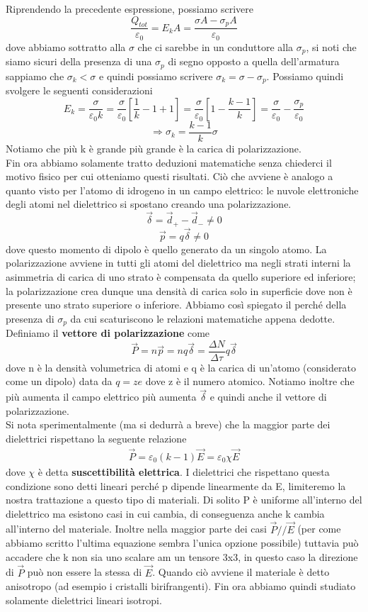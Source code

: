 \documentclass[10pt,a4paper]{article}
\begin{document}
Riprendendo la precedente espressione, possiamo scrivere
 \[\frac{Q_{tot}}{\varepsilon_0} = E_k A = \frac{\sigma A - \sigma_p A}{\varepsilon_0}\]
dove abbiamo sottratto alla $\sigma$ che ci sarebbe in un conduttore alla $\sigma_p$, si noti che siamo sicuri della presenza di una $\sigma_p$ di segno opposto a quella dell'armatura  sappiamo che \(\sigma_k<\sigma\) e quindi possiamo scrivere \(\sigma_k = \sigma -\sigma_p\). Possiamo quindi svolgere le seguenti considerazioni
\[E_k = \frac{\sigma }{\varepsilon_0 k} = \frac{\sigma}{\varepsilon_0}\left[\frac{1}{k}-1+1\right] = \frac{\sigma}{\varepsilon_0}\left[1-\frac{k-1}{k}\right] = \frac{\sigma}{\varepsilon_0}-\frac{\sigma_p}{\varepsilon_0}\]
\[\Rightarrow \sigma_k = \frac{k-1}{k}\sigma\]
Notiamo che più k è grande più grande è la carica di polarizzazione.\\
Fin ora abbiamo solamente tratto deduzioni matematiche senza chiederci il motivo fisico per cui otteniamo questi risultati. Ciò che avviene è analogo a quanto visto per l'atomo di idrogeno in un campo elettrico: le nuvole elettroniche degli atomi nel dielettrico si spostano creando una polarizzazione. 
\[\vec{\delta} = \vec{d}_+ -\vec{d}_- \neq 0\]
\[\vec{p} = q\vec{\delta}\neq 0\]
dove questo momento di dipolo è quello generato da un singolo atomo. La polarizzazione avviene in tutti gli atomi del dielettrico ma negli strati interni la asimmetria di carica di uno strato è compensata da quello superiore ed inferiore; la polarizzazione crea dunque una densità di carica solo in superficie dove non è presente uno strato superiore o inferiore. Abbiamo così spiegato il perché della presenza di \(\sigma_p\) da cui scaturiscono le relazioni matematiche appena dedotte. Definiamo il \textbf{vettore di polarizzazione} come
\[\vec{P} = n\vec{p} = nq\vec{\delta} = \frac{\Delta N}{\Delta \tau} q \vec{\delta} \]  
dove n è la densità volumetrica di atomi e q è la carica di un'atomo (considerato come un dipolo) data da \(q = ze\) dove z è il numero atomico. Notiamo inoltre che più aumenta il campo elettrico più aumenta $\vec{\delta}$ e quindi anche il vettore di polarizzazione.\\
Si nota sperimentalmente (ma si dedurrà a breve) che la maggior parte dei dielettrici rispettano la seguente relazione
\begin{align}\label{eq:polarizzazione_lineare}
	\vec{P} = \varepsilon_0(k-1)\vec{E} = \varepsilon_0 \chi \vec{E}
\end{align}
dove $\chi$ è detta \textbf{suscettibilità elettrica}. I dielettrici che rispettano questa condizione sono detti lineari perché p dipende linearmente da E, limiteremo la nostra trattazione a questo tipo di materiali. Di solito P è uniforme all'interno del dielettrico ma esistono casi in cui cambia, di conseguenza anche k cambia all'interno del materiale. Inoltre nella maggior parte dei casi \(\vec{P} // \vec{E}\) (per come abbiamo scritto l'ultima equazione sembra l'unica opzione possibile) tuttavia può accadere che k non sia uno scalare am un tensore 3x3, in questo caso la direzione di $\vec{P}$ può non essere la stessa di $\vec{E}$. Quando ciò avviene il materiale è detto anisotropo (ad esempio i cristalli birifrangenti). Fin ora abbiamo quindi studiato solamente dielettrici lineari isotropi.
\end{document}
